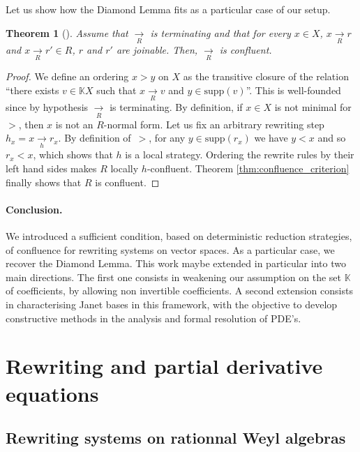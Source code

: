 \documentclass[10pt]{easychair}
\newtheorem{theorem}{Theorem}[section]
\theoremstyle{definition}
\newcommand\K{\mathbb{K}}
\newcommand\KX{\K X}
\newcommand\supp{\text{supp}}
\newcommand\rewR{\underset{R}{\longrightarrow}}
\newcommand\rewh{\underset{h}{\longrightarrow}}
\begin{document}
\medskip


Let us show how the Diamond Lemma fits as a particular case of our setup.
\smallskip

\begin{theorem}[\cite{MR506890}]\label{thm:diamond_lemma}
  Assume that $\rewR$ is terminating and that for every $x\in X$, $x\rewR r$ and $x\rewR r'\in R$, $r$ and $r'$ are joinable. Then, $\rewR$ is confluent.
\end{theorem}

\begin{proof}
  We define an ordering $x > y$ on $X$ as the transitive closure of the relation ``there exists $v \in \KX$ such that $x \rewR v$ and $y\in\supp(v)$''. This is well-founded since by hypothesis $\rewR$ is terminating. By definition, if $x \in X$ is not minimal for $>$, then $x$ is not an $R$-normal form. Let us fix an arbitrary rewriting step $h_x= x \rewh r_x$.  By definition of~$>$, for any $y \in \supp(r_x)$ we have $y < x$ and so $r_x < x$, which shows that  $h$ is a local strategy. Ordering the rewrite rules by their left hand sides makes $R$ locally $h$-confluent. Theorem \ref{thm:confluence_criterion} finally shows that $R$ is confluent.  
\end{proof}

\paragraph{Conclusion.} We introduced a sufficient condition, based on deterministic reduction strategies, of confluence for rewriting systems on vector spaces. As a particular case, we recover the Diamond Lemma. This work maybe extended in particular into two main directions. The first one consists in weakening our assumption on the set $\K$ of coefficients, by allowing non invertible coefficients. A second extension consists in characterising Janet bases in this framework, with the objective to develop constructive methods in the analysis and formal resolution of PDE's.

\section{Rewriting and partial derivative equations}

\subsection{Rewriting systems on rationnal Weyl algebras}
\end{document}

